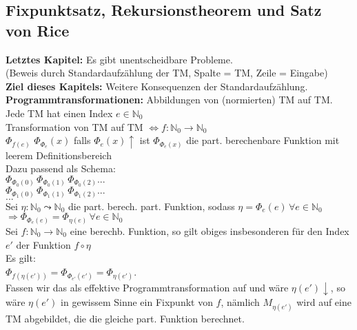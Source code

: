 
\subsection{Fixpunktsatz, Rekursionstheorem und Satz von Rice}
 
\textbf{Letztes Kapitel:} Es gibt unentscheidbare Probleme. \\
(Beweis durch Standardaufzählung der TM, Spalte = TM, Zeile = Eingabe) \\

\textbf{Ziel dieses Kapitels:} Weitere Konsequenzen der Standardaufzählung. \\

\textbf{Programmtransformationen:} Abbildungen von (normierten) TM auf TM. \\

Jede TM hat einen Index $e \in \mathbb{N}_0$ \\
Transformation von TM auf TM $\Leftrightarrow f: \mathbb{N}_0 \rightarrow \mathbb{N}_0$ \\
$\Phi_{f(e)}$
$\Phi_{\Phi_{e}}(x)$ falls $\Phi_e(x)\uparrow$ ist $\Phi_{\Phi_e(x)}$ die 
part. berechenbare Funktion mit leerem Definitionsbereich \\

Dazu passend als Schema: \\
$\Phi_{\Phi_0(0)} \, \Phi_{\Phi_0(1)} \, \Phi_{\Phi_0(2)}...$ \\
$\Phi_{\Phi_1(0)} \, \Phi_{\Phi_1(1)} \, \Phi_{\Phi_1(2)}...$ \\
$...$ \\

Sei $\eta : \mathbb{N}_0 \leadsto \mathbb{N}_0$ die part. berech. part. Funktion, sodass 
$\eta = \Phi_e(e) \, \forall e \in \mathbb{N}_0$ \\
$\Rightarrow \Phi_{\Phi_e(e)} = \Phi_{\eta(e)} \, \forall e \in \mathbb{N}_0$ \\

Sei $f: \mathbb{N}_0 \rightarrow \mathbb{N}_0$ eine berechb. Funktion, so gilt obiges insbesonderen für den Index $e'$
der Funktion $f \circ \eta$ \\

Es gilt: \\
$\Phi_{f(\eta(e'))} = \Phi_{\Phi_{e'}(e')} = \Phi_{\eta(e')}$. \\

Fassen wir das als effektive Programmtransformation auf und wäre $\eta(e')\downarrow$, so wäre $\eta(e')$ in
gewissem Sinne ein Fixpunkt von $f$, nämlich $M_{\eta(e')}$ wird auf eine TM abgebildet, die die gleiche part. Funktion berechnet.

